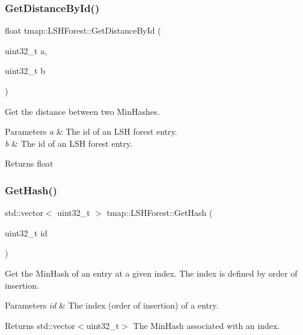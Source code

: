 \subsubsection{\texorpdfstring{Get\+Distance\+By\+Id()}{GetDistanceById()}}
{\footnotesize\ttfamily float tmap\+::\+L\+S\+H\+Forest\+::\+Get\+Distance\+By\+Id (\begin{DoxyParamCaption}\item[{uint32\+\_\+t}]{a,  }\item[{uint32\+\_\+t}]{b }\end{DoxyParamCaption})}



Get the distance between two Min\+Hashes. 


\begin{DoxyParams}{Parameters}
{\em a} & The id of an L\+SH forest entry. \\
\hline
{\em b} & The id of an L\+SH forest entry. \\
\hline
\end{DoxyParams}
\begin{DoxyReturn}{Returns}
float 
\end{DoxyReturn}
\mbox{\label{classtmap_1_1LSHForest_a78106dd9e3a9a9ec012e5405445be78c}} 
\subsubsection{\texorpdfstring{Get\+Hash()}{GetHash()}}
{\footnotesize\ttfamily std\+::vector$<$ uint32\+\_\+t $>$ tmap\+::\+L\+S\+H\+Forest\+::\+Get\+Hash (\begin{DoxyParamCaption}\item[{uint32\+\_\+t}]{id }\end{DoxyParamCaption})}



Get the Min\+Hash of an entry at a given index. The index is defined by order of insertion. 


\begin{DoxyParams}{Parameters}
{\em id} & The index (order of insertion) of a entry. \\
\hline
\end{DoxyParams}
\begin{DoxyReturn}{Returns}
std\+::vector$<$uint32\+\_\+t$>$ The Min\+Hash associated with an index. 
\end{DoxyReturn}
\mbox{\label{classtmap_1_1LSHForest_a3b7e2142901c7d42ff6d0d31de078f96}} 
